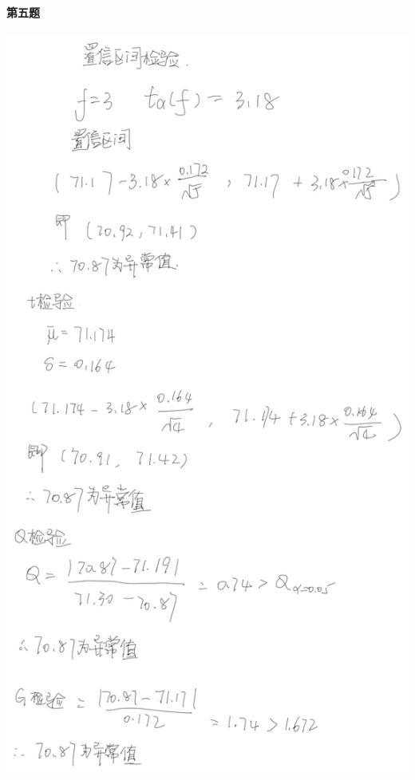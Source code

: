 \documentclass[utf8]{ctexart}
\begin{document}
    \paragraph*{第五题}
    \includegraphics[scale=0.6]{lib/assign1-2.jpg}
\end{document}
